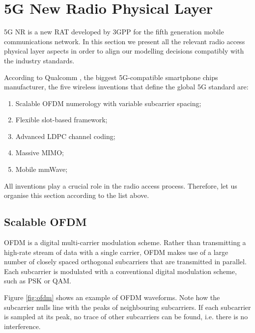\section{5G New Radio Physical Layer}
\label{sec:5gphy}


5G \ac{NR} is a new \ac{RAT} developed by \ac{3GPP} for the fifth generation mobile communications network. In this section we present all the relevant radio access physical layer aspects in order to align our modelling decisions compatibly with the industry standards.

According to Qualcomm \cite{qualcomm_innovative_five}, the biggest 5G-compatible smartphone chips manufacturer, the five wireless inventions that define the global 5G standard are:

\begin{enumerate}
    \item Scalable \acs{OFDM} numerology with variable subcarrier spacing;
    \item Flexible slot-based framework;
    \item Advanced \ac{LDPC} channel coding;
    \item Massive MIMO;
    \item Mobile mmWave;
\end{enumerate}

All inventions play a crucial role in the radio access process. Therefore, let us organise this section according to the list above. 


\subsection*{Scalable OFDM}

\ac{OFDM} is a digital multi-carrier modulation scheme. Rather than transmitting a high-rate stream of data with a single carrier, \ac{OFDM} makes use of a large number of closely spaced orthogonal subcarriers that are transmitted in parallel. Each subcarrier is modulated with a conventional digital modulation scheme, such as \ac{PSK} or \ac{QAM}. 

Figure \ref{fig:ofdm} shows an example of OFDM waveforms. Note how the subcarrier nulls line with the peaks of neighbouring subcarriers. If each subcarrier is sampled at its peak, no trace of other subcarriers can be found, i.e. there is no interference.



